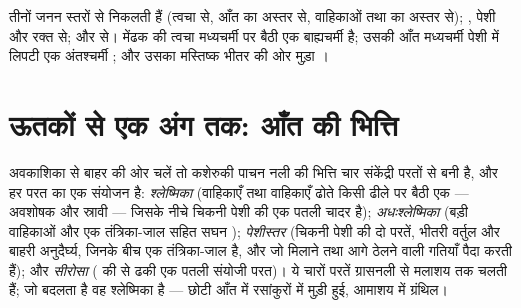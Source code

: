 \begin{example}[ऊतक कहाँ से आते हैं]\label{ex:b1:body-plans-tissues:origin}
 तीनों जनन स्तरों से निकलती हैं (त्वचा  से, आँत का
अस्तर  से, वाहिकाओं तथा  का अस्तर  से); , पेशी और रक्त  से; और   से। मेंढक की
त्वचा मध्यचर्मी  पर बैठी एक बाह्यचर्मी  है; उसकी आँत
मध्यचर्मी पेशी में लिपटी एक अंतश्चर्मी ; और उसका मस्तिष्क भीतर की
ओर मुड़ा ।
\end{example}

\section{ऊतकों से एक अंग तक: आँत की भित्ति}

\begin{proposition}[आँत की भित्ति की चार परतें]\label{prop:b1:body-plans-tissues:gutwall}
अवकाशिका से बाहर की ओर चलें तो कशेरुकी पाचन नली की भित्ति चार संकेंद्री
परतों से बनी है, और हर परत  का एक संयोजन है: \emph{श्लेष्मिका}
(वाहिकाएँ तथा  वाहिकाएँ ढोते किसी ढीले  पर बैठी एक
 --- अवशोषक और स्रावी --- जिसके नीचे चिकनी पेशी की एक पतली चादर
है); \emph{अधःश्लेष्मिका} (बड़ी वाहिकाओं और एक तंत्रिका-जाल सहित सघन
); \emph{पेशीस्तर} (चिकनी पेशी की दो परतें, भीतरी वर्तुल और
बाहरी अनुदैर्घ्य, जिनके बीच एक तंत्रिका-जाल है, और जो मिलाने तथा आगे
ठेलने वाली गतियाँ पैदा करती हैं); और \emph{सीरोसा} ( की  से
ढकी एक पतली संयोजी परत)। ये चारों परतें ग्रासनली से मलाशय तक चलती हैं;
जो बदलता है वह श्लेष्मिका है --- छोटी आँत में रसांकुरों में मुड़ी हुई,
आमाशय में ग्रंथिल।
\end{proposition}

